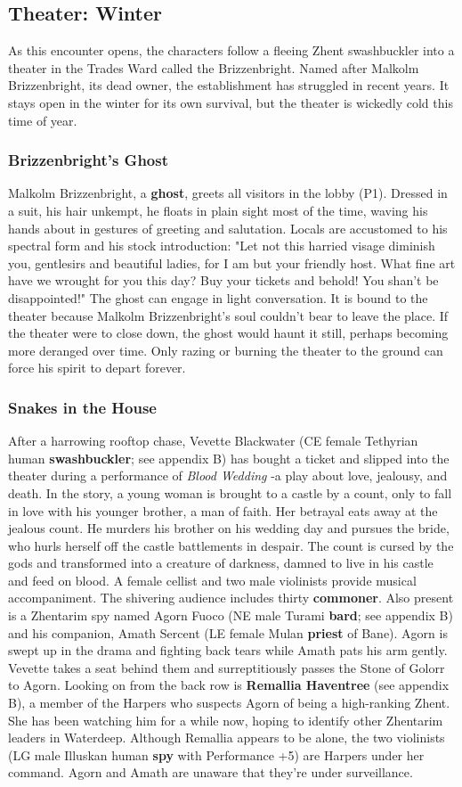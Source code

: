\documentclass[10pt,a4paper,twoside,twocolumn,openany,nodeprecatedcode]{dndbook}
\begin{document}
\subsection{Theater: Winter}
As this encounter opens, the characters follow a fleeing Zhent swashbuckler into a theater in the Trades Ward called the Brizzenbright. Named after Malkolm Brizzenbright, its dead owner, the establishment has struggled in recent years. It stays open in the winter for its own survival, but the theater is wickedly cold this time of year.
\subsubsection{Brizzenbright's Ghost}
Malkolm Brizzenbright, a \textbf{ghost}, greets all visitors in the lobby (P1). Dressed in a suit, his hair unkempt, he floats in plain sight most of the time, waving his hands about in gestures of greeting and salutation. Locals are accustomed to his spectral form and his stock introduction: "Let not this harried visage diminish you, gentlesirs and beautiful ladies, for I am but your friendly host. What fine art have we wrought for you this day? Buy your tickets and behold! You shan't be disappointed!"
The ghost can engage in light conversation. It is bound to the theater because Malkolm Brizzenbright's soul couldn't bear to leave the place. If the theater were to close down, the ghost would haunt it still, perhaps becoming more deranged over time. Only razing or burning the theater to the ground can force his spirit to depart forever.
\subsubsection{Snakes in the House}
After a harrowing rooftop chase, Vevette Blackwater (CE female Tethyrian human \textbf{swashbuckler}; see appendix B) has bought a ticket and slipped into the theater during a performance of \textit{Blood Wedding} -a play about love, jealousy, and death. In the story, a young woman is brought to a castle by a count, only to fall in love with his younger brother, a man of faith. Her betrayal eats away at the jealous count. He murders his brother on his wedding day and pursues the bride, who hurls herself off the castle battlements in despair. The count is cursed by the gods and transformed into a creature of darkness, damned to live in his castle and feed on blood. A female cellist and two male violinists provide musical accompaniment.
The shivering audience includes thirty \textbf{commoner}. Also present is a Zhentarim spy named Agorn Fuoco (NE male Turami \textbf{bard}; see appendix B) and his companion, Amath Sercent (LE female Mulan \textbf{priest} of Bane). Agorn is swept up in the drama and fighting back tears while Amath pats his arm gently. Vevette takes a seat behind them and surreptitiously passes the Stone of Golorr to Agorn. Looking on from the back row is \textbf{Remallia Haventree} (see appendix B), a member of the Harpers who suspects Agorn of being a high-ranking Zhent. She has been watching him for a while now, hoping to identify other Zhentarim leaders in Waterdeep. Although Remallia appears to be alone, the two violinists (LG male Illuskan human \textbf{spy} with Performance +5) are Harpers under her command. Agorn and Amath are unaware that they're under surveillance.
\end{document}
